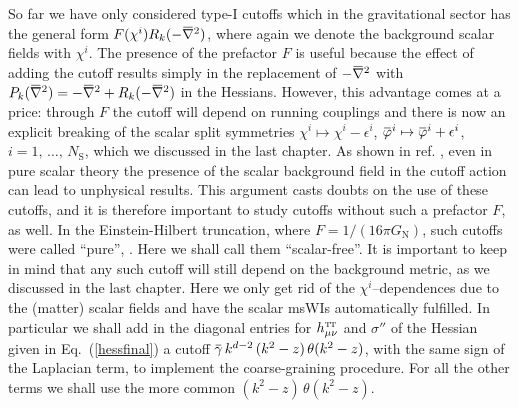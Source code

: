 \documentclass[11pt]{book} %
\newcommand{\overbar}[1]{\mkern 1.5mu\overline{\mkern-1.5mu#1\mkern-1.5mu}\mkern 1.5mu}
\newcommand\TTspace{ -1pt }
\newcommand\hTTmunu{ h^{\scriptscriptstyle{\mathrm{T\hspace{\TTspace}T}}}_{\mu\nu} }
\newcommand\NS{ N_{\scriptscriptstyle{\mathrm{S}}} }
\newcommand\GNewton{ G_{\scriptscriptstyle{\mathrm{N}}} }
\newcommand{\bnabla}{\overbar \nabla}
\newcommand{\bp}{\overbar \varphi}
\newcommand{\bg}{\overbar \gamma}
\numberwithin{equation}{chapter}
\begin{document}
So far we have only considered type-I cutoffs which in the gravitational
sector has the general form $F(\chi^i)R_k(-\bnabla^2)$, where again we denote
the background scalar fields with $\chi^i$.
The presence of the prefactor $F$ is useful because the effect
of adding the cutoff results simply in the replacement of
$-\bnabla^2$ with $P_k(\bnabla^2)=-\bnabla^2+R_k(-\bnabla^2)$
in the Hessians.
However, this advantage comes at a price:
through $F$ the cutoff will depend on running couplings
and there is now an explicit breaking of the scalar split symmetries
$\chi^i \mapsto \chi^i - \epsilon^i$,
$\bp ^i \mapsto \bp ^i + \epsilon^i$, $i=1,\,\dots,\,\NS$, which we discussed in the last chapter.
As shown in ref. \cite{Bridle:2013sra}, even in pure scalar theory
the presence of the scalar background field
in the cutoff action can lead to unphysical results.
This argument casts doubts on the use of these cutoffs,
and it is therefore important to study cutoffs without
such a prefactor $F$, as well.
In the Einstein-Hilbert truncation, where $F=1/(16\pi \GNewton)$,
such cutoffs were called ``pure'', \cite{Narain:2009qa}.
Here we shall call them ``scalar-free''.
It is important to keep in mind that any such cutoff will still
depend on the background metric, as we discussed in the last chapter.
Here we only get rid of the $\chi^i$--dependences due to the (matter) scalar fields
and have the scalar msWIs automatically fulfilled.
In particular we shall add in the diagonal entries for $\hTTmunu$
and $\sigma''$ of the Hessian given in Eq.~(\ref{hessfinal})
a cutoff $\bg \, k^{d-2} \, (k^2-z) \, \theta(k^2-z)$,
with the same sign of the Laplacian term, to implement the coarse-graining procedure.
For all the other terms we shall use the more common
$(k^2-z) \, \theta(k^2-z)$.
\end{document}
